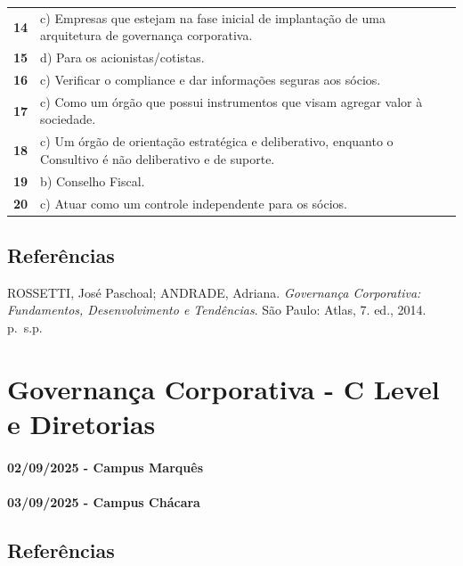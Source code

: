 \documentclass[
]{book}
\begin{document}
\begin{longtable}[]{@{}
  >{\raggedright\arraybackslash}p{}
  >{\raggedright\arraybackslash}p{}@{}}
\textbf{14} & c) Empresas que estejam na fase inicial de implantação de uma arquitetura de governança corporativa. \\
\textbf{15} & d) Para os acionistas/cotistas. \\
\textbf{16} & c) Verificar o compliance e dar informações seguras aos sócios. \\
\textbf{17} & c) Como um órgão que possui instrumentos que visam agregar valor à sociedade. \\
\textbf{18} & c) Um órgão de orientação estratégica e deliberativo, enquanto o Consultivo é não deliberativo e de suporte. \\
\textbf{19} & b) Conselho Fiscal. \\
\textbf{20} & c) Atuar como um controle independente para os sócios. \\
\end{longtable}

\section{Referências}\label{referuxeancias-2}

ROSSETTI, José Paschoal; ANDRADE, Adriana. \emph{Governança Corporativa: Fundamentos, Desenvolvimento e Tendências}. São Paulo: Atlas, 7. ed., 2014. p.~s.p.

\chapter{Governança Corporativa - C Level e Diretorias}\label{governanuxe7a-corporativa---c-level-e-diretorias}

\subsubsection*{02/09/2025 - Campus Marquês}\label{campus-marquuxeas-4}

\subsubsection*{03/09/2025 - Campus Chácara}\label{campus-chuxe1cara-4}

\section{Referências}\label{referuxeancias-3}
\end{document}
